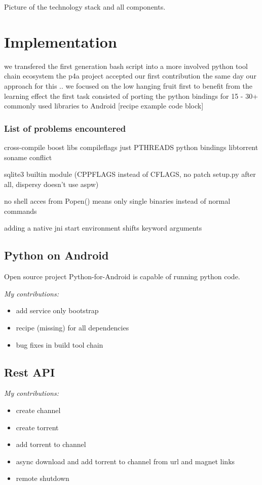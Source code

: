 \documentclass[]{report}
\begin{document}
Picture of the technology stack and all components.


\chapter{Implementation}


we transfered the first generation bash script into a more involved python tool chain ecosystem
the p4a project accepted our first contribution the same day
our approach for this .. we focused on the low hanging fruit first to benefit from the learning effect
the first task consisted of porting the python bindings for 15 - 30+ commonly used libraries to Android [recipe example code block]

\subsection*{List of problems encountered}
cross-compile boost libs compileflags just PTHREADS
python bindings libtorrent soname conflict


sqlite3 builtin module (CPPFLAGS instead of CFLAGS, no patch setup.py after all, dispersy doesn't use aspw)


no shell acces from Popen() means only single binaries instead of normal commands

adding a native jni start environment shifts keyword arguments



\section{Python on Android}
Open source project Python-for-Android is capable of running python code.

\emph{My contributions:}
\begin{itemize}
	\item add service only bootstrap
	\item recipe (missing) for all dependencies
	\item bug fixes in build tool chain
\end{itemize}


\section{Rest API}

\emph{My contributions:}
\begin{itemize}
	\item create channel
	\item create torrent
	\item add torrent to channel
	\item async download and add torrent to channel from url and magnet links
	\item remote shutdown
\end{itemize}
\end{document}
